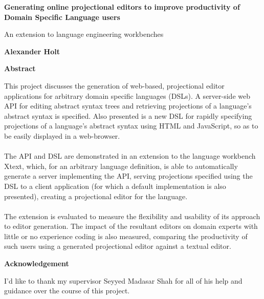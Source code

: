 \documentclass{article}
\begin{document}
\clearpage
%
\thispagestyle{plain}
\begin{center}
    \Large
    \textbf{Generating online projectional editors to improve productivity of Domain Specific Language users}
    
    \vspace{0.4cm}
    \large
    An extension to language engineering workbenches
    
    \vspace{0.4cm}
    \textbf{Alexander Holt}
    
    \vspace{0.9cm}
    \textbf{Abstract}
\end{center}
This project discusses the generation of web-based, projectional editor applications for arbitrary domain specific languages (DSLs). A server-side web API for editing abstract syntax trees and retrieving projections of a language's abstract syntax is specified. Also presented is a new DSL for rapidly specifying projections of a language's abstract syntax using HTML and JavaScript, so as to be easily displayed in a web-browser. 
\\
\\
The API and DSL are demonstrated in an extension to the language workbench Xtext, which, for an arbitrary language definition, is able to automatically generate a server implementing the API, serving projections specified using the DSL to a client application (for which a default implementation is also presented), creating a projectional editor for the language.
\\
\\
The extension is evaluated to measure the flexibility and usability of its approach to editor generation. The impact of the resultant editors on domain experts with little or no experience coding is also measured, comparing the productivity of such users using a generated projectional editor against a textual editor. 
\begin{center}
	\vspace {1.5cm}
    \Large
    \textbf{Acknowledgement}
\end{center}
I'd like to thank my supervisor Seyyed Madasar Shah for all of his help and guidance over the course of this project.
\end{document}
